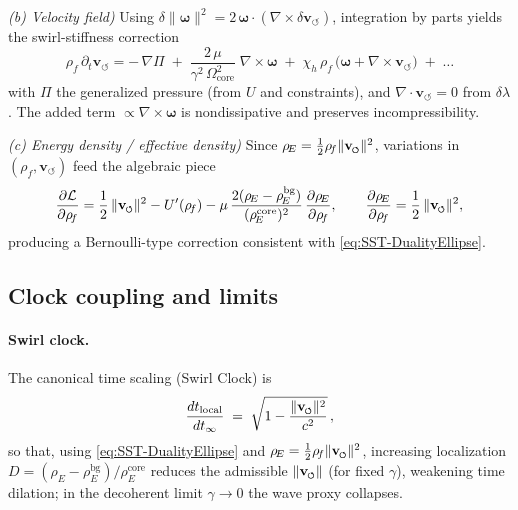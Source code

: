 \documentclass[10pt,reprint,aps,onecolumn,nofootinbib]{revtex4-2}
\newcommand{\vswirl}{\mathbf{v}_{\!\boldsymbol{\circlearrowleft}}}
\newcommand{\vnorm}{\lVert \mathbf{v}_{\mkern-2mu\scriptscriptstyle\boldsymbol{\circlearrowleft}} \rVert}               %
\newcommand{\rhoE}{\rho_{\!E}}                           %
\newcommand{\omegaVec}{\boldsymbol{\omega}}
\newcommand{\rhoF}{\rho_{\!f}}     %
\newcommand{\OmegaCore}{\Omega_{\mathrm{core}}}
\newcommand{\bg}{\mathrm{bg}}
\newcommand{\core}{\mathrm{core}}
\begin{document}
        \noindent\emph{(b) Velocity field)}
        Using $\delta\lVert\omegaVec\rVert^{2}=2\,\omegaVec\!\cdot\!(\nabla\times\delta\vswirl)$,
        integration by parts yields the swirl-stiffness correction
        \begin{equation}
        \rhoF\,\partial_t\vswirl
        = -\,\nabla\Pi \;+\; \frac{2\,\mu}{\gamma^{2}\,\OmegaCore^{2}}\;\nabla\times\omegaVec
        \;+\;\chi_h\,\rhoF\,\big(\omegaVec+\nabla\times\vswirl\big)
        \;+\;\ldots
        \label{eq:EL-velocity}
        \end{equation}
        with $\Pi$ the generalized pressure (from $U$ and constraints), and $\nabla\!\cdot\!\vswirl=0$ from $\delta\lambda$.
        The added term $\propto\nabla\times\omegaVec$ is nondissipative and preserves incompressibility.

        \noindent\emph{(c) Energy density / effective density)}
        Since $\rhoE=\tfrac12\rhoF\vnorm^2$, variations in $(\rhoF,\vswirl)$ feed the algebraic piece
        \begin{equation}
        \frac{\partial \mathcal L}{\partial \rhoF}
        = \frac12\,\vnorm^2 - U'(\rhoF)
        - \mu\,\frac{2(\rhoE-\rhoE^{\bg})}{(\rhoE^{\core})^{2}}\,\frac{\partial \rhoE}{\partial \rhoF},
        \qquad
        \frac{\partial \rhoE}{\partial \rhoF}=\frac12\,\vnorm^2,
        \end{equation}
        producing a Bernoulli-type correction consistent with \eqref{eq:SST-DualityEllipse}.

    \subsection{Clock coupling and limits}
    \label{subsec:Clock-Limits}

    \paragraph{Swirl clock.}
        The canonical time scaling (Swirl Clock) is
        \begin{equation}
        \frac{dt_{\text{local}}}{dt_{\infty}}
        \;=\;\sqrt{1-\frac{\vnorm^{2}}{c^{2}}}\,,
        \end{equation}
        so that, using \eqref{eq:SST-DualityEllipse} and $\rhoE=\tfrac12\rhoF\vnorm^2$,
        increasing localization $D=(\rhoE-\rhoE^{\bg})/\rhoE^{\core}$ reduces the admissible $\vnorm$
        (for fixed $\gamma$), weakening time dilation; in the decoherent limit $\gamma\to0$ the wave proxy collapses.
\end{document}
